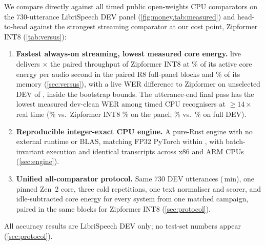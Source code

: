  We compare \ultra{} directly against all
\ColdComparatorCount{} timed public open-weights CPU comparators on the 730-utterance LibriSpeech
DEV panel (\cref{fig:money,tab:measured}) and head-to-head against the strongest streaming
comparator at our cost point, Zipformer INT8 (\cref{tab:versus}):
\begin{enumerate}
\item \textbf{Fastest always-on streaming, lowest measured core energy.} \ultra{} live delivers
  \VsSpeedXOne$\times$ the paired throughput of Zipformer INT8 at \VsEnergyPctOne\% of its active
  core energy per audio second in the paired R8 full-panel blocks and \VsRssPctOne\% of its memory (\cref{sec:versus}), with a live WER difference to Zipformer on unselected DEV of
  \LookLiveCZipDelta\pp, inside the bootstrap bounds. The utterance-end final pass has the lowest
  measured dev-clean WER among timed CPU recognisers at $\geq 14\times$ real time
  (\FinPanelClean\% vs.\ Zipformer INT8 \FinPanelZipClean\% on the panel; \FinFullClean\% vs.\ \FinFullZipClean\% on full DEV).
\item \textbf{Reproducible integer-exact CPU engine.} A pure-Rust engine with no external runtime or
  BLAS, matching FP32 PyTorch within \RelIntEightDelta\pp, with batch-invariant execution and
  identical transcripts across x86 and ARM CPUs (\cref{sec:engine}).
\item \textbf{Unified all-comparator protocol.} Same 730 DEV utterances (\ColdAudioMinutes\,min), one
  pinned Zen~2 core, three cold repetitions, one text normaliser and scorer, and idle-subtracted core
  energy for every system from one matched campaign, paired in the same blocks for Zipformer INT8 (\cref{sec:protocol}).
\end{enumerate}
All accuracy results are LibriSpeech DEV only; no test-set numbers appear (\cref{sec:protocol}).
